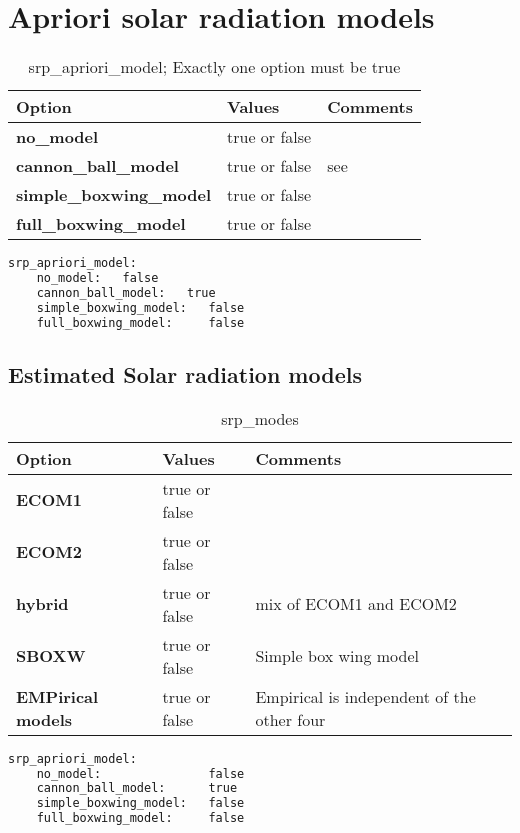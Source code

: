 \section{Apriori solar radiation models}   
%
\begin{table}[h!]
	\begin{tabular}{|p{4.5cm}|p{2cm}|p{3.5cm}|}
		\hline
		Option & Values & Comments \\
		\hline
		\textbf{no\_model}  & true or false & \\
		\textbf{cannon\_ball\_model} & true or false & see \nameref{sec:cannonball_srp}\\
		\textbf{simple\_boxwing\_model} & true or false & \\
		\textbf{full\_boxwing\_model} & true or false & \\
		\hline
	\end{tabular}
	\caption{srp\_apriori\_model; Exactly one option must be true}
	\label{table:label_name}
\end{table}
%
{\small
\begin{lstlisting}[language=xml,caption=yaml example for apriori srp model options]
srp_apriori_model:
	no_model:   false
	cannon_ball_model:   true
	simple_boxwing_model:   false
	full_boxwing_model:     false
\end{lstlisting}
}
%
\subsection{Estimated Solar radiation models}
\begin{table}[h!]
	\begin{tabular}{|p{4.5cm}|p{2cm}|p{3.5cm}|}
		\hline
		Option & Values & Comments \\
		\hline
		\textbf{ECOM1}  & true or false & \\ 
		\textbf{ECOM2}  & true or false & \\
		\textbf{hybrid} & true or false &  mix of ECOM1 and ECOM2\\
		\textbf{SBOXW}  & true or  false & Simple box wing model\\
		\textbf{EMPirical models} & true or false & Empirical is independent of the other four\\
		\hline
	\end{tabular}
	\caption{srp\_modes}
	\label{table:label_name}
\end{table}
%
%
{\small
\begin{lstlisting}[language=xml,caption=yaml example for apriori srp model options]
srp_apriori_model:
	no_model:               false
	cannon_ball_model:      true
	simple_boxwing_model:   false
	full_boxwing_model:     false
\end{lstlisting}
}
%
